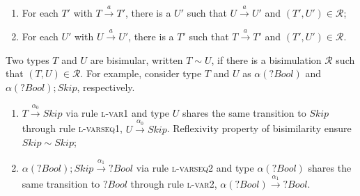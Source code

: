 \documentclass[sigplan]{acmart}
\newcommand{\srule}[1]{\textsc{#1}}
\begin{document}
\begin{enumerate}
    \item For each \(T'\) with \(T \xrightarrow{a} T'\), there is a \(U'\) such that \(U \xrightarrow{a} U'\) and \((T',U') \in \mathcal{R}\);
    \item For each \(U'\) with \(U \xrightarrow{a} U'\), there is a \(T'\) such that \(T \xrightarrow{a} T'\) and \((T',U') \in \mathcal{R}\).
\end{enumerate}

Two types $T$ and $U$ are bisimular, written $T \sim U$, if there is a bisimulation $\mathcal{R}$ such that $(T,U)\in\mathcal{R}$. For example, consider type $T$ and $U$ as $\alpha(?Bool)$ and $\alpha(?Bool);Skip$, respectively. 
\begin{enumerate}
    \item $T \xrightarrow{\alpha_0} Skip$ via rule \srule{l-var1} and type $U$ shares the same transition to $Skip$ through rule \srule{l-varseq1}, $U \xrightarrow{\alpha_0} Skip$. Reflexivity property of bisimilarity ensure $Skip\sim Skip$;
    \begin{center}
\end{center}
    \item $\alpha(?Bool);Skip \xrightarrow{\alpha_1} ?Bool$ via rule \srule{l-varseq2} and type $\alpha(?Bool)$ shares the same transition to $?Bool$ through rule \srule{l-var2}, $\alpha(?Bool) \xrightarrow{\alpha_1} ?Bool$.
    \begin{center}
\end{center}
\end{enumerate}
\end{document}
